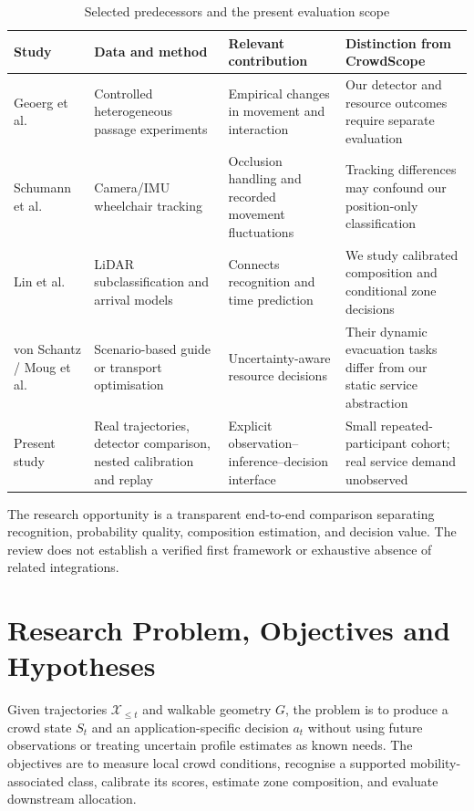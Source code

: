 \documentclass[conference]{IEEEtran}
\begin{document}
\begin{table}[t]
\caption{Selected predecessors and the present evaluation scope}
\label{tab:literature}\centering\small
\begin{tabular}{>{\raggedright\arraybackslash}p{2.6cm}>{\raggedright\arraybackslash}p{3.8cm}>{\raggedright\arraybackslash}p{4.1cm}>{\raggedright\arraybackslash}p{4.8cm}}
\toprule Study & Data and method & Relevant contribution & Distinction from CrowdScope\\\midrule
Geoerg et al.~\cite{sime,geoerg} & Controlled heterogeneous passage experiments & Empirical changes in movement and interaction & Our detector and resource outcomes require separate evaluation\\
Schumann et al.~\cite{tracking} & Camera/IMU wheelchair tracking & Occlusion handling and recorded movement fluctuations & Tracking differences may confound our position-only classification\\
Lin et al.~\cite{lin} & LiDAR subclassification and arrival models & Connects recognition and time prediction & We study calibrated composition and conditional zone decisions\\
von Schantz / Moug et al.~\cite{guides,moug} & Scenario-based guide or transport optimisation & Uncertainty-aware resource decisions & Their dynamic evacuation tasks differ from our static service abstraction\\
Present study & Real trajectories, detector comparison, nested calibration and replay & Explicit observation--inference--decision interface & Small repeated-participant cohort; real service demand unobserved\\\bottomrule
\end{tabular}
\end{table}

The research opportunity is a transparent end-to-end comparison separating recognition, probability quality, composition estimation, and decision value. The review does not establish a verified first framework or exhaustive absence of related integrations.

\section{Research Problem, Objectives and Hypotheses}
Given trajectories $\mathcal{X}_{\leq t}$ and walkable geometry $G$, the problem is to produce a crowd state $S_t$ and an application-specific decision $a_t$ without using future observations or treating uncertain profile estimates as known needs. The objectives are to measure local crowd conditions, recognise a supported mobility-associated class, calibrate its scores, estimate zone composition, and evaluate downstream allocation.
\end{document}
